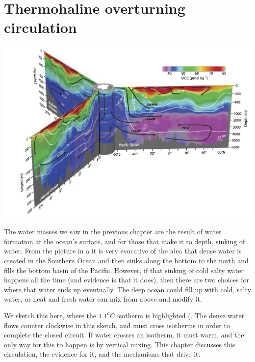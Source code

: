 
\chapter{Thermohaline overturning circulation}
\label{ch:thermohaline}

\includegraphics[width=6in]{figs/WaterMasses/HansellEtAl09.png}


The water masses we saw in the previous chapter are the result of water formation at the ocean's surface, and for those that make it to depth, sinking of water.  From the picture in a it is very evocative of the idea that dense water is created in the Southern Ocean and then sinks along the bottom to the north and fills the bottom basin of the Pacific.  However, if that sinking of cold salty water happens all the time (and evidence is that it does), then there are  two choices for where that water ends up eventually.  The deep ocean could fill up with cold, salty water, or heat and fresh water can mix from above and modify it.  

We sketch this here, where the $1.1^oC$ isotherm is highlighted (.  The dense water flows counter clockwise in this sketch, and must cross isotherms in order to complete the closed circuit.  If water crosses an isotherm, it must warm, and the only way for this to happen is by vertical mixing.  This chapter discusses this circulation, the evidence for it, and the mechanisms that drive it.


